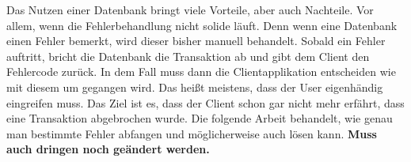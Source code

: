
Das Nutzen einer Datenbank bringt viele Vorteile, aber auch Nachteile.
Vor allem, wenn die Fehlerbehandlung nicht solide läuft.
Denn wenn eine Datenbank einen Fehler bemerkt, wird dieser bisher manuell behandelt.
Sobald ein Fehler auftritt, bricht die Datenbank die Transaktion ab und gibt dem Client den Fehlercode zurück.
In dem Fall muss dann die Clientapplikation entscheiden wie mit diesem um gegangen wird.
Das heißt meistens, dass der User eigenhändig eingreifen muss.
Das Ziel ist es, dass der Client schon gar nicht mehr erfährt, dass eine Transaktion abgebrochen wurde.
Die folgende Arbeit behandelt, wie genau man bestimmte Fehler abfangen und möglicherweise auch lösen kann.
\textbf{Muss auch dringen noch geändert werden.}